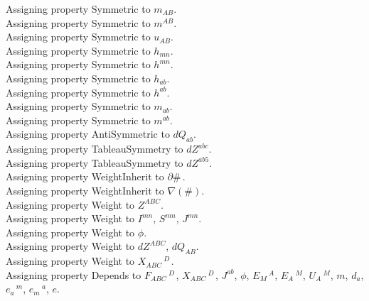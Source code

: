 \documentclass[11pt]{article}
\begin{document}
Assigning property Symmetric to ${m}_{A B}$.
\\
Assigning property Symmetric to ${m}^{A B}$.
\\
Assigning property Symmetric to ${u}_{A B}$.
\\
Assigning property Symmetric to ${h}_{m n}$.
\\
Assigning property Symmetric to ${h}^{m n}$.
\\
Assigning property Symmetric to ${h}_{a b}$.
\\
Assigning property Symmetric to ${h}^{a b}$.
\\
Assigning property Symmetric to ${m}_{a b}$.
\\
Assigning property Symmetric to ${m}^{a b}$.
\\
Assigning property AntiSymmetric to ${dQ}_{a b}$.
\\
Assigning property TableauSymmetry to ${dZ}^{a b c}$.
\\
Assigning property TableauSymmetry to ${dZ}^{a b 5}$.
\\
Assigning property WeightInherit to $\partial{\#}\, $.
\\
Assigning property WeightInherit to $\nabla(\#)$.
\\
Assigning property Weight to ${Z}^{A B C}$.
\\
Assigning property Weight to ${I}^{m n}$, ${S}^{m n}$, ${J}^{m n}$.
\\
Assigning property Weight to $\phi$.
\\
Assigning property Weight to ${dZ}^{A B C}$, ${dQ}_{A B}$.
\\
Assigning property Weight to ${X}_{A B C}\,^{D\, }$.
\\
Assigning property Depends to ${F}_{A B C}\,^{D\, }$, ${X}_{A B C}\,^{D\, }$, ${J}^{a b}$, $\phi$, ${E}_{M}\,^{A}$, ${E}_{A}\,^{M}$, ${U}_{A}\,^{M}$, $m$, ${d}_{a}$, ${e}_{a}\,^{m}$, ${e}_{m}\,^{a}$, $e$.
\end{document}
